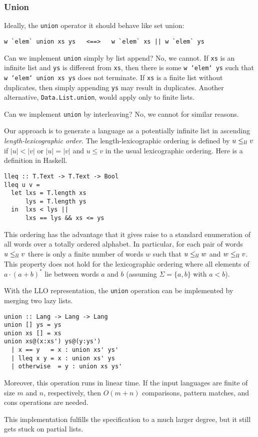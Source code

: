 \subsubsection{Union}
Ideally, the \texttt{union} operator it should behave like
set union:
\begin{verbatim}
w `elem` union xs ys   <==>   w `elem` xs || w `elem` ys
\end{verbatim}
Can we implement \texttt{union} simply by list append?
No, we cannot. 
If \texttt{xs} is an infinite list and \texttt{ys} is different from
\texttt{xs}, then there is some \texttt{w `elem` ys} such that
\texttt{w `elem` union xs ys} does not terminate.
If \texttt{xs} is a finite list without duplicates, then simply
appending \texttt{ys} may result in duplicates.
Another alternative, \texttt{Data.List.union}, would apply only to finite lists.

Can we implement \texttt{union} by interleaving? No, we cannot for
similar reasons.

Our approach is to generate a language as a potentially infinite list
in ascending \emph{length-lexicographic order}. The
length-lexicographic ordering is defined by $u \le_{ll} 
v$ if $|u|<|v|$ or $|u|=|v|$ and $u\le v$ in the usual lexicographic
ordering. Here is a definition in Haskell.
\begin{verbatim}
lleq :: T.Text -> T.Text -> Bool
lleq u v =
  let lxs = T.length xs
      lys = T.length ys
  in  lxs < lys ||
      lxs == lys && xs <= ys
\end{verbatim}
This ordering has the advantage that it gives raise to a standard
enumeration of all words over a totally ordered alphabet. In
particular, for each pair of words $u \le_{ll} v$ there is only a finite
number of words $w$ such that $u \le_{ll} w$ and $w \le_{ll} v$. This property does
not hold for the lexicographic ordering where all elements of $a\cdot
(a+b)^*$ lie between words $a$ and $b$ (assuming $\Sigma = \{a, b\}$
with $a<b$).

With the LLO representation, the \texttt{union} operation can be
implemented by merging two lazy lists.
\begin{verbatim}
union :: Lang -> Lang -> Lang
union [] ys = ys
union xs [] = xs
union xs@(x:xs') ys@(y:ys')
  | x == y   = x : union xs' ys'
  | lleq x y = x : union xs' ys
  | otherwise  = y : union xs ys'
\end{verbatim}
Moreover, this operation runs in linear time. If the input languages
are finite of size $m$ and $n$, respectively, then $O(m+n)$
comparisons, pattern matches, and cons operations are needed.

This implementation fulfills the specification to a much larger
degree, but it still gets stuck on partial lists.

